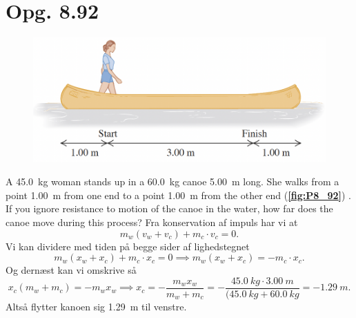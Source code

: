 \documentclass[12pt]{article}
\begin{document}
\section*{Opg. 8.92}

\begin{figure} [ht]
  \centering
  \caption{}
  \includegraphics[width=0.5\linewidth]{../figures/P8_92.png}
  \label{fig:P8_92}
\end{figure}

A \qty{45,0}{kg} woman stands up in a \qty{60,0}{kg} canoe \qty{5,00}{m} long. She walks from a point \qty{1,00}{m} from one end to a point \qty{1,00}{m} from the other end (\textbf{\autoref{fig:P8_92}}) . If you ignore resistance to motion of the canoe in the water, how far does the canoe move during this process?
\bigbreak
Fra konservation af impuls har vi at
\[
m_w\left( v_w + v_c \right) + m_c \cdot  v_c = 0
.\] 
Vi kan dividere med tiden på begge sider af lighedstegnet
\[
m_w(x_w + x_c) + m_c \cdot x_c = 0 \implies m_w(x_w + x_c) = - m_c \cdot x_c
.\] 
Og dernæst kan vi omskrive så
\[
x_c(m_w + m_c) = - m_w x_w \implies x_c = -\frac{m_w x_w}{m_w + m_c} = -\frac{\qty{45,0}{kg}\cdot \qty{3,00}{m}}{(\qty{45,0}{kg} + \qty{60,0}{kg}} = -\qty{1,29}{m}
.\] 
Altså flytter kanoen sig \qty{1,29}{m} til venstre.
\end{document}
